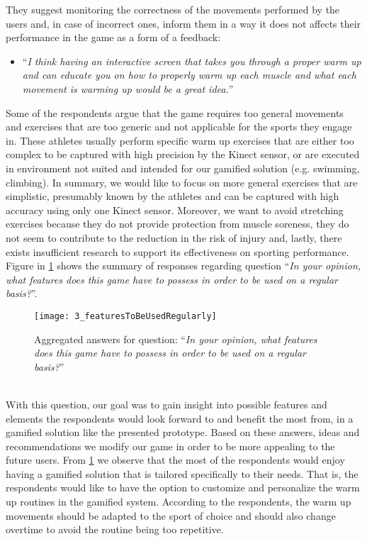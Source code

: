 They suggest monitoring the correctness of the movements performed by the users and, in case of incorrect ones, inform them in a way it does not affects their performance in the game as a form of a feedback:
\begin{itemize}
\item ``\textit{I think having an interactive screen that takes you through a proper warm up and can educate you on how to properly warm up each muscle and what each movement is warming up would be a great idea.}''
\end{itemize}
Some of the respondents argue that the game requires too general movements and exercises that are too generic and not applicable for the sports they engage in. These athletes usually perform specific warm up exercises that are either too complex to be captured with high precision by the Kinect sensor, or are executed in environment not suited and intended for our gamified solution (e.g. swimming, climbing). In summary, we would like to focus on more general exercises that are simplistic, presumably known by the athletes and can be captured with high accuracy using only one Kinect sensor. Moreover, we want to avoid stretching exercises because they do not provide protection from muscle soreness, they do not seem to contribute to the reduction in the risk of injury and, lastly, there exists insufficient research to support its effectiveness on sporting performance.\\  Figure in \ref{fig:3_featuresToBeUsedRegularly} shows the summary of responses regarding question ``\textit{In your opinion, what features does this game have to possess in order to be used on a regular basis?}''.\\
\begin{figure}[h]
    \centering
    \texttt{[image: 3\_featuresToBeUsedRegularly]}
    \caption{Aggregated answers for question: ``\textit{In your opinion, what features does this game have to possess in order to be used on a regular basis?}''}
    \label{fig:3_featuresToBeUsedRegularly}
\end{figure}\\
With this question, our goal was to gain insight into possible features and elements the respondents would look forward to and benefit the most from, in a gamified solution like the presented prototype. Based on these answers, ideas and recommendations we modify our game in order to be more appealing to the future users. From \ref{fig:3_featuresToBeUsedRegularly} we observe that the most of the respondents would enjoy having a gamified solution that is tailored specifically to their needs. That is, the respondents would like to have the option to customize and personalize the warm up routines in the gamified system. According to the respondents, the warm up movements should be adapted to the sport of choice and should also change overtime to avoid the routine being too repetitive.\\
